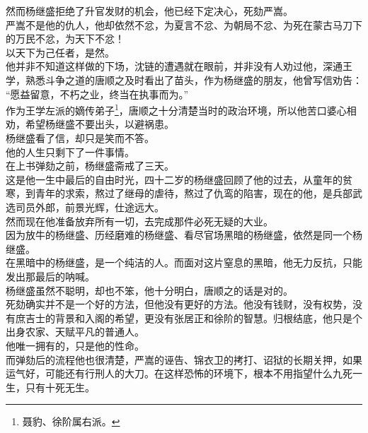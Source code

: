\begin{multicols}{\theparacolNo}
然而杨继盛拒绝了升官发财的机会，他已经下定决心，死劾严嵩。\\

严嵩不是他的仇人，他却依然不忿，为夏言不忿、为朝局不忿、为死在蒙古马刀下的万民不忿，为天下不忿！\\

以天下为己任者，是然。\\

他并非不知道这样做的下场，沈链的遭遇就在眼前，并非没有人劝过他，深通王学，熟悉斗争之道的唐顺之及时看出了苗头，作为杨继盛的朋友，他曾写信劝告：\\

“愿益留意，不朽之业，终当在执事而为。”\\

作为王学左派的嫡传弟子\footnote{聂豹、徐阶属右派。}，唐顺之十分清楚当时的政治环境，所以他苦口婆心相劝，希望杨继盛不要出头，以避祸患。\\

杨继盛看了信，却只是笑而不答。\\

他的人生只剩下了一件事情。\\

在上书弹劾之前，杨继盛斋戒了三天。\\

这是他一生中最后的自由时光，四十二岁的杨继盛回顾了他的过去，从童年的贫寒，到青年的求索，熬过了继母的虐待，熬过了仇鸾的陷害，现在的他，是兵部武选司员外郎，前景光辉，仕途远大。\\

然而现在他准备放弃所有一切，去完成那件必死无疑的大业。\\

因为放牛的杨继盛、历经磨难的杨继盛、看尽官场黑暗的杨继盛，依然是同一个杨继盛。\\

在黑暗中的杨继盛，是一个纯洁的人。而面对这片窒息的黑暗，他无力反抗，只能发出那最后的呐喊。\\

杨继盛虽然不聪明，却也不笨，他十分明白，唐顺之的话是对的。\\

死劾确实并不是一个好的方法，但他没有更好的方法。他没有钱财，没有权势，没有庶吉士的背景和入阁的希望，更没有张居正和徐阶的智慧。归根结底，他只是个出身农家、天赋平凡的普通人。\\

他唯一拥有的，只是他的性命。\\

而弹劾后的流程他也很清楚，严嵩的诬告、锦衣卫的拷打、诏狱的长期关押，如果运气好，可能还有行刑人的大刀。在这样恐怖的环境下，根本不用指望什么九死一生，只有十死无生。\\


\end{multicols}
